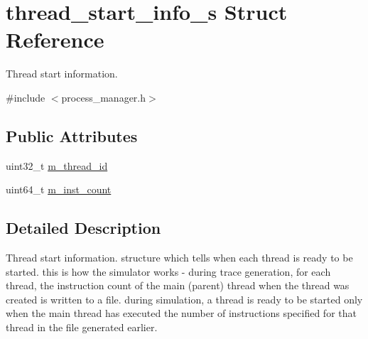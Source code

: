 \hypertarget{structthread__start__info__s}{
\section{thread\_\-start\_\-info\_\-s Struct Reference}
\label{structthread__start__info__s}
}


Thread start information.  




{\ttfamily \#include $<$process\_\-manager.h$>$}

\subsection*{Public Attributes}
\begin{DoxyCompactItemize}
\item 
uint32\_\-t \hyperlink{structthread__start__info__s_a957332c460e5f4b4199921a6d1cb99da}{m\_\-thread\_\-id}
\item 
uint64\_\-t \hyperlink{structthread__start__info__s_ab1635b429a81daf00cf5272114b94a1b}{m\_\-inst\_\-count}
\end{DoxyCompactItemize}


\subsection{Detailed Description}
Thread start information. structure which tells when each thread is ready to be started. this is how the simulator works -\/ during trace generation, for each thread, the instruction count of the main (parent) thread when the thread was created is written to a file. during simulation, a thread is ready to be started only when the main thread has executed the number of instructions specified for that thread in the file generated earlier. 

